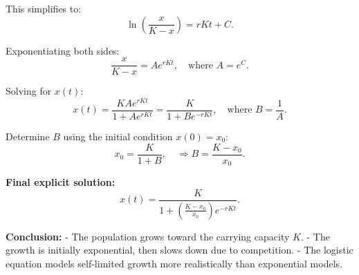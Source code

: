 This simplifies to:
\[
\ln\left(\frac{x}{K - x}\right) = rK t + C.
\]

Exponentiating both sides:
\[
\frac{x}{K - x} = A e^{rK t}, \quad \text{where } A = e^C.
\]

Solving for \( x(t) \):
\[
x(t) = \frac{K A e^{rK t}}{1 + A e^{rK t}} = \frac{K}{1 + B e^{-rK t}}, \quad \text{where } B = \frac{1}{A}.
\]

Determine \( B \) using the initial condition \( x(0) = x_0 \):
\[
x_0 = \frac{K}{1 + B}, \quad \Rightarrow B = \frac{K - x_0}{x_0}.
\]

\textbf{Final explicit solution:}
\[
x(t) = \frac{K}{1 + \left( \frac{K - x_0}{x_0} \right) e^{-rK t}}.
\]

\vspace{1em}
\noindent
\textbf{Conclusion:}
- The population grows toward the carrying capacity \( K \).
- The growth is initially exponential, then slows down due to competition.
- The logistic equation models self-limited growth more realistically than exponential models.